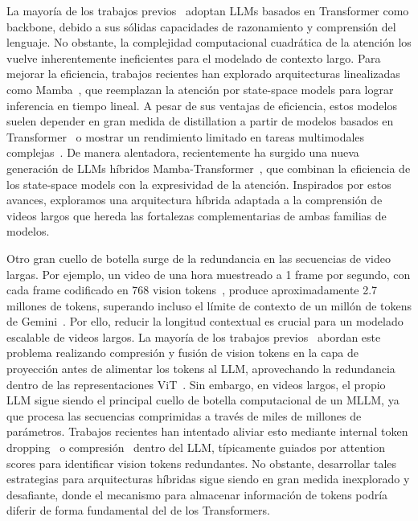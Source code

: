 \documentclass[10pt,twocolumn,letterpaper]{article}
\begin{document}
La mayoría de los trabajos previos~\cite{li2024videochatflash,shu2025videoxl1} adoptan LLMs basados en Transformer como backbone, debido a sus sólidas capacidades de razonamiento y comprensión del lenguaje.
No obstante, la complejidad computacional cuadrática de la atención los vuelve inherentemente ineficientes para el modelado de contexto largo.
Para mejorar la eficiencia, trabajos recientes han explorado arquitecturas linealizadas como Mamba~\cite{gu2024mamba,dao2024mamba2}, que reemplazan la atención por state-space models para lograr inferencia en tiempo lineal.
A pesar de sus ventajas de eficiencia, estos modelos suelen depender en gran medida de distillation a partir de modelos basados en Transformer~\cite{li2025matvlm,liao2025mmmamba} o mostrar un rendimiento limitado en tareas multimodales complejas~\cite{wang2024longllava,zhao2025cobra}.
De manera alentadora, recientemente ha surgido una nueva generación de LLMs híbridos Mamba-Transformer~\cite{li2025minimax,basant2025nanov2,zuo2025falconh1,dong2025hymba,ren2025samba,lenz2025jamba}, que combinan la eficiencia de los state-space models con la expresividad de la atención.
Inspirados por estos avances, exploramos una arquitectura híbrida adaptada a la comprensión de videos largos que hereda las fortalezas complementarias de ambas familias de modelos.

Otro gran cuello de botella surge de la redundancia en las secuencias de video largas.
Por ejemplo, un video de una hora muestreado a 1 frame por segundo, con cada frame codificado en 768 vision tokens~\cite{zhai2023siglip}, produce aproximadamente 2.7 millones de tokens, superando incluso el límite de contexto de un millón de tokens de Gemini~\cite{comanici2025gemini2.5pro}.
Por ello, reducir la longitud contextual es crucial para un modelado escalable de videos largos.
La mayoría de los trabajos previos~\cite{islam2025bimba,shen2025longvu,li2024llamavid,chen2024internvl,liu2024nvila,xu2025auroralong} abordan este problema realizando compresión y fusión de vision tokens en la capa de proyección antes de alimentar los tokens al LLM, aprovechando la redundancia dentro de las representaciones ViT~\cite{bolya2022tokenmerge}.
Sin embargo, en videos largos, el propio LLM sigue siendo el principal cuello de botella computacional de un MLLM, ya que procesa las secuencias comprimidas a través de miles de millones de parámetros.
Trabajos recientes han intentado aliviar esto mediante internal token dropping~\cite{xing2024pyramiddrop,chen2024fastv,zhang2024sparsevlm,song2024moviechat} o compresión~\cite{shu2025videoxl1,ren2025vamba} dentro del LLM, típicamente guiados por attention scores para identificar vision tokens redundantes.
No obstante, desarrollar tales estrategias para arquitecturas híbridas sigue siendo en gran medida inexplorado y desafiante, donde el mecanismo para almacenar información de tokens podría diferir de forma fundamental del de los Transformers.
\end{document}
